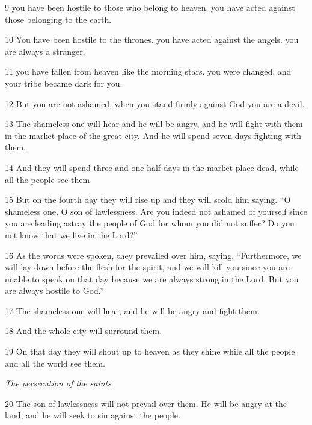 \par 9 you have been hostile to those who belong to heaven. you have acted against those belonging to the earth.

\par 10 You have been hostile to the thrones. you have acted against the angels. you are always a stranger.

\par 11 you have fallen from heaven like the morning stars. you were changed, and your tribe became dark for you.

\par 12 But you are not ashamed, when you stand firmly against God you are a devil.

\par 13 The shameless one will hear and he will be angry, and he will fight with them in the market place of the great city. And he will spend seven days fighting with them.

\par 14 And they will spend three and one half days in the market place dead, while all the people see them

\par 15 But on the fourth day they will rise up and they will scold him saying. “O shameless one, O son of lawlessness. Are you indeed not ashamed of yourself since you are leading astray the people of God for whom you did not suffer? Do you not know that we live in the Lord?”

\par 16 As the words were spoken, they prevailed over him, saying, “Furthermore, we will lay down before the flesh for the spirit, and we will kill you since you are unable to speak on that day because we are always strong in the Lord. But you are always hostile to God.”

\par 17 The shameless one will hear, and he will be angry and fight them.

\par 18 And the whole city will surround them.

\par 19 On that day they will shout up to heaven as they shine while all the people and all the world see them.


\par \textit{The persecution of the saints}

\par 20 The son of lawlessness will not prevail over them. He will be angry at the land, and he will seek to sin against the people.

